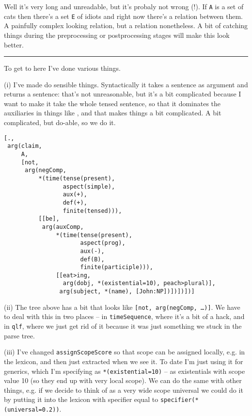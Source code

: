 \documentclass[11pt]{article}
\begin{document}
\noindent
Well it's very long and unreadable, but it's probaly not wrong (!). If
\texttt{A} is a set of cats then there's a set \texttt{E} of idiots
and right now there's a relation between them. A painfully complex
looking relation, but a relation nonetheless. A bit of catching things
during the preprocessing or postprocessing stages will make this look
better. 

\medpara
\hrule

\medpara
To get to here I've done various things.

\medpara
(i) I've made  do sensible things. Syntactically it takes a
sentence as argument and returns a sentence: that's not unreasonable,
but it's a bit complicated because I want to make it take the whole
tensed sentence, so that it dominates the auxiliaries in things like
, and that makes things a bit
complicated. A bit complicated, but do-able, so we do it.


\begin{Verbatim}[commandchars=\\\{\}]
[.,
 arg(claim,
     A,
     [not,
      arg(negComp,
          *(time(tense(present),
                 aspect(simple),
                 aux(+),
                 def(+),
                 finite(tensed))),
          [[be],
           arg(auxComp,
               *(time(tense(present),
                      aspect(prog),
                      aux(-),
                      def(B),
                      finite(participle))),
               [[eat>ing,
                 arg(dobj, *(existential=10), peach>plural)],
                arg(subject, *(name), [John:NP])])])])]
\end{Verbatim}
 
\noindent
(ii) The tree above has a bit that looks like \texttt{[not,
  arg(negComp, \ldots)]}. We have to deal with this in two places --
in \texttt{timeSequence}, where it's a bit of a hack, and in
\texttt{qlf}, where we just get rid of it because it was just
something we stuck in the parse tree.

\medpara
(iii) I've changed \texttt{assignScopeScore} so that scope can be
assigned locally, e.g. in the lexicon, and then just extracted when we
see it. To date I'm just using it for generics, which I'm specifying
as \texttt{*(existential=10)} -- as existentials with scope value 10
(so they end up with very local scope). We can do the same with other
things, e.g. if we decide to think of  as a very wide scope
universal we could do it by putting it into the lexicon with specifier
equal to \texttt{specifier(*(universal=0.2))}.
\end{document}
